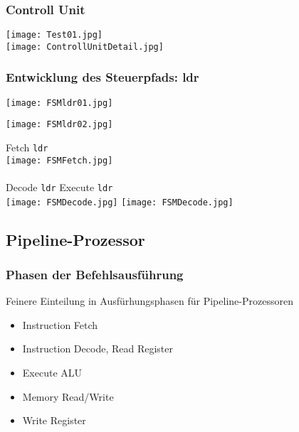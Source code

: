 		\subsubsection{Controll Unit}
			\begin{center}
				\texttt{[image: Test01.jpg]} \\
				\texttt{[image: ControllUnitDetail.jpg]}
			\end{center}

		
		\subsubsection{Entwicklung des Steuerpfads: ldr}
			\begin{minipage}{0.5\textwidth}
				\texttt{[image: FSMldr01.jpg]}
			\end{minipage}
			\begin{minipage}{0.45\textwidth}
				\texttt{[image: FSMldr02.jpg]}
			\end{minipage}
			\begin{center}
				Fetch \texttt{ldr} \\
				\texttt{[image: FSMFetch.jpg]} \\ \mbox{} \\
				Decode \texttt{ldr} \hspace{6cm} Execute \texttt{ldr} \\
				\texttt{[image: FSMDecode.jpg]}
				\texttt{[image: FSMDecode.jpg]}
			\end{center}


	\vspace{0.8cm}
	\subsection{Pipeline-Prozessor}
		\subsubsection{Phasen der Befehlsausführung}
			Feinere Einteilung in Ausfürhungsphasen für Pipeline-Prozessoren
			\begin{itemize}
				\item Instruction Fetch
				\item Instruction Decode, Read Register
				\item Execute ALU
				\item Memory Read/Write
				\item Write Register
			\end{itemize}

